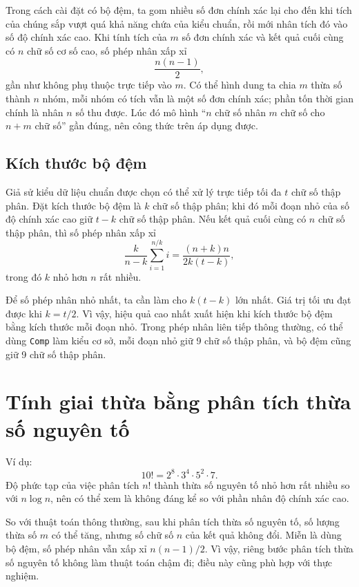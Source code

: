 \documentclass[11pt]{article}
\begin{document}
Trong cách cài đặt có bộ đệm, ta gom nhiều số đơn chính xác lại cho đến khi
tích của chúng sắp vượt quá khả năng chứa của kiểu chuẩn, rồi mới nhân tích
đó vào số độ chính xác cao. Khi tính tích của \(m\) số đơn chính xác và kết
quả cuối cùng có \(n\) chữ số cơ số cao, số phép nhân xấp xỉ
\[
  \frac{n(n-1)}{2},
\]
gần như không phụ thuộc trực tiếp vào \(m\). Có thể hình dung ta chia \(m\)
thừa số thành \(n\) nhóm, mỗi nhóm có tích vẫn là một số đơn chính xác; phần
tốn thời gian chính là nhân \(n\) số thu được. Lúc đó mô hình
``\(n\) chữ số nhân \(m\) chữ số cho \(n+m\) chữ số'' gần đúng, nên công thức
trên áp dụng được.

\subsection{Kích thước bộ đệm}

Giả sử kiểu dữ liệu chuẩn được chọn có thể xử lý trực tiếp tối đa \(t\) chữ
số thập phân. Đặt kích thước bộ đệm là \(k\) chữ số thập phân; khi đó mỗi
đoạn nhỏ của số độ chính xác cao giữ \(t-k\) chữ số thập phân. Nếu kết quả
cuối cùng có \(n\) chữ số thập phân, thì số phép nhân xấp xỉ
\[
  \frac{k}{n-k}\sum_{i=1}^{n/k} i
  =\frac{(n+k)n}{2k(t-k)},
\]
trong đó \(k\) nhỏ hơn \(n\) rất nhiều.

Để số phép nhân nhỏ nhất, ta cần làm cho \(k(t-k)\) lớn nhất. Giá trị tối ưu
đạt được khi \(k=t/2\). Vì vậy, hiệu quả cao nhất xuất hiện khi kích thước bộ
đệm bằng kích thước mỗi đoạn nhỏ. Trong phép nhân liên tiếp thông thường, có
thể dùng \texttt{Comp} làm kiểu cơ sở, mỗi đoạn nhỏ giữ 9 chữ số thập phân,
và bộ đệm cũng giữ 9 chữ số thập phân.

\section{Tính giai thừa bằng phân tích thừa số nguyên tố}

Ví dụ:
\[
  10! = 2^8\cdot 3^4\cdot 5^2\cdot 7.
\]
Độ phức tạp của việc phân tích \(n!\) thành thừa số nguyên tố nhỏ hơn rất
nhiều so với \(n\log n\), nên có thể xem là không đáng kể so với phần nhân độ
chính xác cao.

So với thuật toán thông thường, sau khi phân tích thừa số nguyên tố, số lượng
thừa số \(m\) có thể tăng, nhưng số chữ số \(n\) của kết quả không đổi. Miễn
là dùng bộ đệm, số phép nhân vẫn xấp xỉ \(n(n-1)/2\). Vì vậy, riêng bước
phân tích thừa số nguyên tố không làm thuật toán chậm đi; điều này cũng phù
hợp với thực nghiệm.
\end{document}
